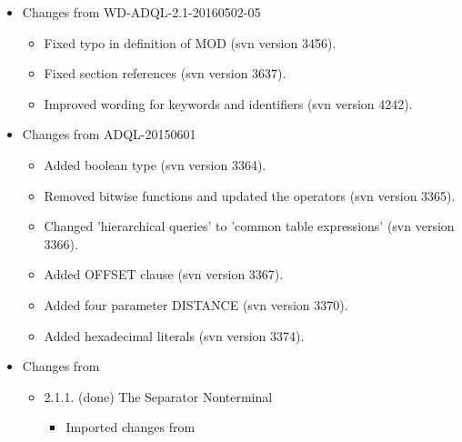 \documentclass[11pt,a4paper]{ivoa}
\begin{document}
\begin{itemize}

    \item Changes from WD-ADQL-2.1-20160502-05
        \begin{itemize}

            \item Fixed typo in definition of MOD (svn version 3456).
            \item Fixed section references (svn version 3637).
            \item Improved wording for keywords and identifiers (svn version 4242).

        \end{itemize}

    \item Changes from ADQL-20150601
        \begin{itemize}

            \item Added boolean type (svn version 3364).

            \item Removed bitwise functions and updated the operators (svn version 3365).

            \item Changed 'hierarchical queries' to 'common table expressions' (svn version 3366).

            \item Added OFFSET clause (svn version 3367).

            \item Added four parameter DISTANCE (svn version 3370).

            \item Added hexadecimal literals (svn version 3374).

        \end{itemize}

    \item Changes from \citet{note:TAPNotes}
        \begin{itemize}

            \item 2.1.1.  (done) The Separator Nonterminal
            \begin{itemize}
                \item Imported changes from \citet{note:ADQL2Err1}
            \end{itemize}
                

\end{itemize}
\end{itemize}
\end{document}
